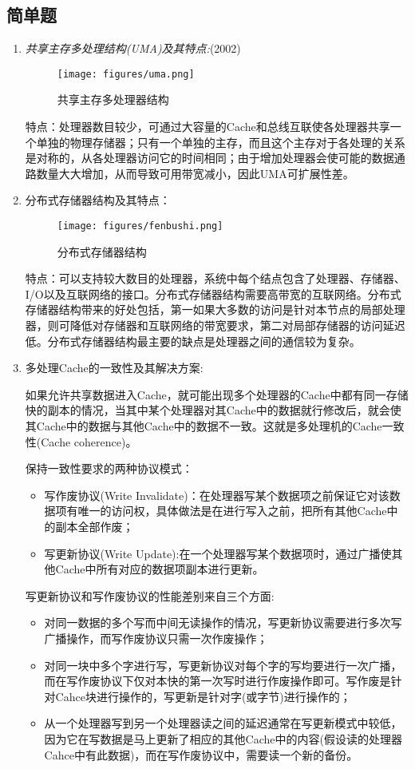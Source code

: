 \documentclass[a4paper]{ctexart}
\begin{document}
\subsection{简单题}
\begin{enumerate}
  \item \emph{共享主存多处理结构(UMA)及其特点:}(2002)
  \begin{figure}[htbp]
    \caption{共享主存多处理器结构}
    \centering
    \texttt{[image: figures/uma.png]}
  \end{figure}
  
  特点：处理器数目较少，可通过大容量的Cache和总线互联使各处理器共享一个单独的物理存储器；只有一个单独的主存，而且这个主存对于各处理的关系是对称的，从各处理器访问它的时间相同；由于增加处理器会使可能的数据通路数量大大增加，从而导致可用带宽减小，因此UMA可扩展性差。
  \item 分布式存储器结构及其特点：
  \begin{figure}[htbp]
    \caption{分布式存储器结构}
    \centering
    \texttt{[image: figures/fenbushi.png]}
  \end{figure}
  
  特点：可以支持较大数目的处理器，系统中每个结点包含了处理器、存储器、I/O以及互联网络的接口。分布式存储器结构需要高带宽的互联网络。分布式存储器结构带来的好处包括，第一如果大多数的访问是针对本节点的局部处理器，则可降低对存储器和互联网络的带宽要求，第二对局部存储器的访问延迟低。分布式存储器结构最主要的缺点是处理器之间的通信较为复杂。
  \item 多处理Cache的一致性及其解决方案:
  
  如果允许共享数据进入Cache，就可能出现多个处理器的Cache中都有同一存储快的副本的情况，当其中某个处理器对其Cache中的数据就行修改后，就会使其Cache中的数据与其他Cache中的数据不一致。这就是多处理机的Cache一致性(Cache coherence)。
  
  保持一致性要求的两种协议模式：
  \begin{itemize}
    \item 写作废协议(Write Invalidate)：在处理器写某个数据项之前保证它对该数据项有唯一的访问权，具体做法是在进行写入之前，把所有其他Cache中的副本全部作废；
    \item 写更新协议(Write Update):在一个处理器写某个数据项时，通过广播使其他Cache中所有对应的数据项副本进行更新。
  \end{itemize}
  写更新协议和写作废协议的性能差别来自三个方面:
  \begin{itemize}
    \item 对同一数据的多个写而中间无读操作的情况，写更新协议需要进行多次写广播操作，而写作废协议只需一次作废操作；
    \item 对同一块中多个字进行写，写更新协议对每个字的写均要进行一次广播，而在写作废协议下仅对本快的第一次写时进行作废操作即可。写作废是针对Cahce块进行操作的，写更新是针对字(或字节)进行操作的；
    \item 从一个处理器写到另一个处理器读之间的延迟通常在写更新模式中较低，因为它在写数据是马上更新了相应的其他Cache中的内容(假设读的处理器Cahce中有此数据)，而在写作废协议中，需要读一个新的备份。
  \end{itemize}
  

\end{enumerate}
\end{document}
